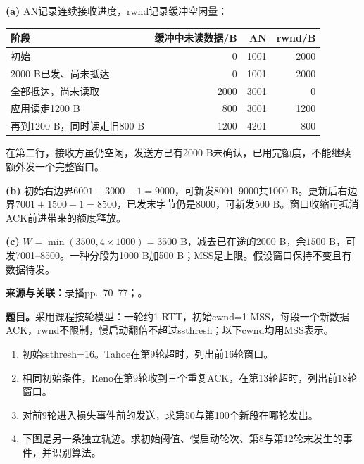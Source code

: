 \begin{workedsolution}
\textbf{(a)} AN记录连续接收进度，rwnd记录缓冲空闲量：
\begin{center}
\small
\begin{tabular}{@{}lrrr@{}}
\toprule
阶段 & 缓冲中未读数据/B & AN & rwnd/B \\
\midrule
初始 & 0 & 1001 & 2000 \\
2000 B已发、尚未抵达 & 0 & 1001 & 2000 \\
全部抵达，尚未读取 & 2000 & 3001 & 0 \\
应用读走1200 B & 800 & 3001 & 1200 \\
再到1200 B，同时读走旧800 B & 1200 & 4201 & 800 \\
\bottomrule
\end{tabular}
\end{center}
在第二行，接收方虽仍空闲，发送方已有2000 B未确认，已用完额度，不能继续额外发一个完整窗口。

\textbf{(b)} 初始右边界$6001+3000-1=9000$，可新发8001--9000共1000 B。更新后右边界$7001+1500-1=8500$，已发末字节仍是8000，可新发500 B。窗口收缩可抵消ACK前进带来的额度释放。

\textbf{(c)} $W=\min(3500,4\times1000)=3500$ B，减去已在途的2000 B，余$\boxed{1500\text{ B}}$，可发7001--8500。一种分段为1000 B加500 B；MSS是上限。假设窗口保持不变且有数据待发。
\end{workedsolution}


\textbf{来源与关联：}录播pp.~70--77；。

\textbf{题目。}采用课程按轮模型：一轮约1 RTT，初始cwnd=1 MSS，每段一个新数据ACK，rwnd不限制，慢启动翻倍不超过ssthresh；以下cwnd均用MSS表示。
\begin{enumerate}[label=(\alph*)]
 \item 初始ssthresh=16。Tahoe在第9轮超时，列出前16轮窗口。
 \item 相同初始条件，Reno在第9轮收到三个重复ACK，在第13轮超时，列出前18轮窗口。
 \item 对前9轮进入损失事件前的发送，求第50与第100个新段在哪轮发出。
 \item 下图是另一条独立轨迹。求初始阈值、慢启动轮次、第8与第12轮末发生的事件，并识别算法。
\end{enumerate}

